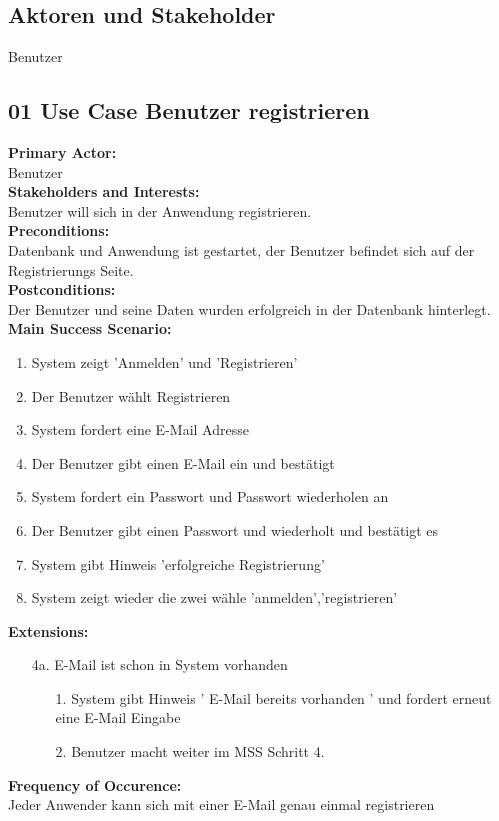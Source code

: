 \documentclass[12pt,a4paper,onecolumn]{article}
\begin{document}
\subsection{Aktoren und Stakeholder}
Benutzer
\subsection{01 Use Case Benutzer registrieren}
\textbf{Primary Actor:}\\ Benutzer\\
\textbf{Stakeholders and Interests:}\\Benutzer will sich in der Anwendung registrieren.\\
\textbf{Preconditions:} \\Datenbank und Anwendung ist gestartet, der Benutzer befindet sich auf der Registrierungs Seite.\\
\textbf{Postconditions:}\\ Der Benutzer und seine Daten wurden erfolgreich in der Datenbank hinterlegt. \\
\textbf{Main Success Scenario:}
\begin{enumerate}
    \item System zeigt 'Anmelden' und 'Registrieren'
    \item Der Benutzer wählt Registrieren
    \item System fordert eine E-Mail Adresse
    \item Der Benutzer gibt einen E-Mail ein und bestätigt
    \item System fordert ein Passwort und Passwort wiederholen an
    \item Der Benutzer gibt einen Passwort und wiederholt und bestätigt es
    \item System gibt Hinweis 'erfolgreiche Registrierung'
    \item System zeigt wieder die zwei wähle 'anmelden','registrieren'
\end{enumerate}
\textbf{Extensions:}
\begin{enumerate}
    \item [4a.]  E-Mail ist schon in System vorhanden
    \begin{enumerate}
        \item[1.]System gibt Hinweis ' E-Mail bereits vorhanden ' und fordert erneut eine E-Mail Eingabe
        \item[2.]Benutzer macht weiter im MSS Schritt 4.
    \end{enumerate}
\end{enumerate}
\textbf{Frequency of Occurence:} \\Jeder Anwender kann sich mit einer E-Mail genau einmal registrieren\\
\end{document}
